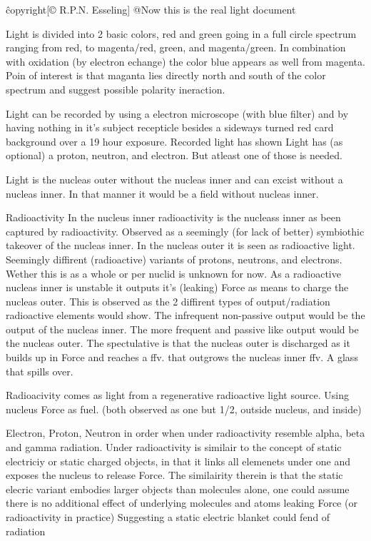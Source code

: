 \^copyright{[© R.P.N. Esseling]}
@Now this is the real light document

Light is divided into 2 basic colors, red and green going in a full circle spectrum ranging from red, to magenta/red, green, and magenta/green.
In combination with oxidation (by electron echange) the color blue appears as well from magenta. 
Poin of interest is that maganta lies directly north and south of the color spectrum and suggest possible polarity ineraction.

Light can be recorded by using a electron microscope (with blue filter) and by having nothing in it's subject recepticle besides a sideways turned red card background over a 19 hour exposure.
Recorded light has shown Light has (as optional) a proton, neutron, and electron. But atleast one of those is needed.

Light is the nucleas outer without the nucleas inner and can excist without a nucleas inner. In that manner it would be a field without nucleas inner.

Radioactivity
In the nucleus inner radioactivity is the nucleass inner as been captured by radioactivity. Observed as a seemingly (for lack of better) symbiothic takeover of the nucleas inner.
In the nucleas outer it is seen as radioactive light. Seemingly diffirent (radioactive) variants of protons, neutrons, and electrons. Wether this is as a whole or per nuclid is unknown for now.
As a radioactive nucleas inner is unstable it outputs it's (leaking) Force as means to charge the nucleas outer. This is observed as the 2 diffirent types of output/radiation radioactive elements would show. The infrequent non-passive output would be the output of the nucleas inner. The more frequent and passive like output would be the nucleas outer.
The spectulative is that the nucleas outer is discharged as it builds up in Force and reaches a ffv. that outgrows the nucleas inner ffv. A glass that spills over.

Radioacivity comes as light from a regenerative radioactive light source. Using nucleus Force as fuel.
(both observed as one but 1/2, outside nucleus, and inside)

Electron, Proton, Neutron in order when under radioactivity resemble alpha, beta and gamma radiation.
Under radioactivity is similair to the concept of static electriciy or static charged objects, in that it links all elemenets under one and exposes the nucleus to release Force.
The similairity therein is that the static elecric variant embodies larger objects than molecules alone, one could assume there is  no additional effect of underlying molecules and atoms leaking Force (or radioactivity in practice)
Suggesting a static electric blanket could fend of radiation

